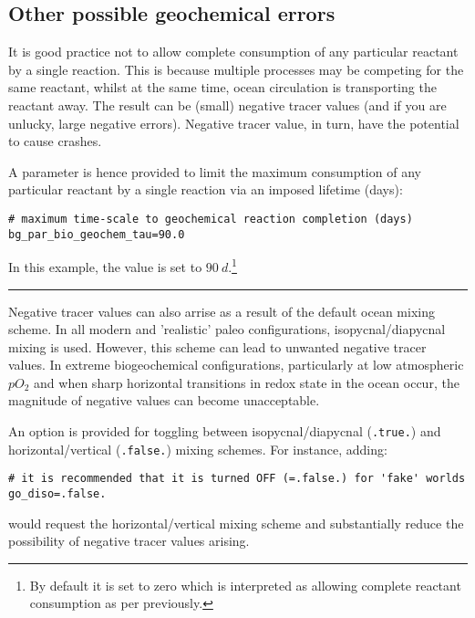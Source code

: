\documentclass[11pt,fleqn]{book} %
\begin{document}
\subsection{Other possible geochemical errors}

It is good practice not to allow complete consumption of any particular reactant by a single reaction. This is because multiple processes may be competing for the same reactant, whilst at the same time, ocean circulation is transporting the reactant away. The result can be (small) negative tracer values (and if you are unlucky, large negative errors). Negative tracer value, in turn, have the potential to cause crashes.

A parameter is hence provided to limit the maximum consumption of any particular reactant by a single reaction via an imposed lifetime (days): 
\small\vspace{-1mm}\begin{verbatim}
# maximum time-scale to geochemical reaction completion (days)
bg_par_bio_geochem_tau=90.0
\end{verbatim}\vspace{-1mm}\normalsize

\noindent In this example, the value is set to \(90\:d\).\footnote{By default it is set to zero which is interpreted as allowing complete reactant consumption as per previously.}

\vspace{1mm}
\noindent\rule{4cm}{0.5pt}
\vspace{2mm}

\noindent Negative tracer values can also arrise as a result of the default ocean mixing scheme. In all modern and 'realistic' paleo configurations, isopycnal/diapycnal mixing is used. However, this scheme can lead to unwanted negative tracer values. In extreme biogeochemical configurations, particularly at low atmospheric \(pO_{2}\) and when sharp horizontal transitions in redox state in the ocean occur, the magnitude of negative values can become unacceptable.

An option is provided for toggling between isopycnal/diapycnal (\texttt{.true.}) and horizontal/vertical (\texttt{.false.}) mixing schemes. For instance, adding:
\small\vspace{-2pt}\begin{verbatim}
# it is recommended that it is turned OFF (=.false.) for 'fake' worlds
go_diso=.false.
\end{verbatim}\vspace{-2pt}\normalsize
would request the horizontal/vertical mixing scheme and substantially reduce the possibility of negative tracer values arising.
\end{document}
